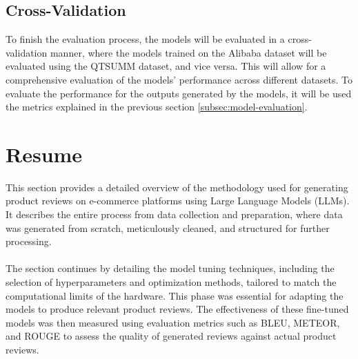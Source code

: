 \subsection{Cross-Validation}
To finish the evaluation process, the models will be evaluated in a cross-validation manner, where the models trained on the Alibaba dataset will be evaluated using the QTSUMM dataset, and vice versa. This will allow for a comprehensive evaluation of the models' performance across different datasets. To evaluate the performance for the outputs generated by the models, it will be used the metrics explained in the previous section \ref{subsec:model-evaluation}.

\section{Resume}
This section provides a detailed overview of the methodology used for generating product reviews on e-commerce platforms using Large Language Models (LLMs). It describes the entire process from data collection and preparation, where data was generated from scratch, meticulously cleaned, and structured for further processing.
\\\\
The section continues by detailing the model tuning techniques, including the selection of hyperparameters and optimization methods, tailored to match the computational limits of the hardware. This phase was essential for adapting the models to produce relevant product reviews. The effectiveness of these fine-tuned models was then measured using evaluation metrics such as BLEU, METEOR, and ROUGE to assess the quality of generated reviews against actual product reviews.